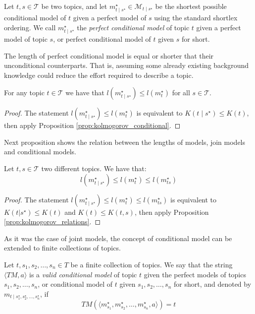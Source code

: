 \begin{definition}
Let $t,s \in \mathcal{T}$ be two topics, and let $m_{t \mid s^\star}^{\star} \in \mathcal{M}_{t \mid s^\star}$ be the shortest possible conditional model of $t$ given a perfect model of $s$ using the standard shortlex ordering. We call $m_{t \mid s^\star}^{\star}$ the \emph{perfect conditional model} of topic $t$ given a perfect model of topic $s$, or perfect conditional model of $t$ given $s$ for short.
\end{definition}

The length of perfect conditional model is equal or shorter that their unconditional counterparts. That is, assuming some already existing background knowledge could reduce the effort required to describe a topic.

\begin{proposition}
\label{prop:description_conditional_inequality}
For any topic $t \in \mathcal{T}$ we have that $l \left( m_{t \mid s^\star}^{\star} \right) \leq l \left(m^\star_t\right)$ for all $s \in \mathcal{T}$.
\end{proposition}
\begin{proof}
The statement $l \left( m_{t \mid s^\star}^{\star} \right) \leq l \left(m^\star_t\right)$ is equivalent to $K(t \mid s^\star) \leq K(t)$, then apply Proposition \ref{prop:kolmogorov_conditional}.
\end{proof}

Next proposition shows the relation between the lengths of models, join models and conditional models.

\begin{proposition}
\label{prop:description_conditional_joint}
Let $t, s \in \mathcal{T}$ two different topics. We have that:
\[
l \left( m_{t \mid s^\star}^{\star} \right) \leq l \left( m_t^\star \right) \leq l \left( m_{ts}^\star \right)
\]
\end{proposition}
\begin{proof}
The statement $l \left( m_{t \mid s^\star}^{\star} \right) \leq l \left( m_t^\star \right) \leq l \left( m_{ts}^\star \right)$ is equivalent to $K(t | s^\star ) \leq K(t)$ and $K(t) \leq K(t, s)$, then apply Proposition \ref{prop:kolmogorov_relations}.
\end{proof}

As it was the case of joint models, the concept of conditional model can be extended to finite collections of topics.

\begin{definition}
Let $t, s_1, s_2, \ldots, s_n \in T$ be a finite collection of topics. We say that the string $\langle TM,a \rangle$ is a \emph{valid conditional model} of topic $t$ given the perfect models of topics $s_1, s_2, \ldots, s_n$, or conditional model of $t$ given $s_1, s_2, \ldots, s_n$ for short, and denoted by $m_{t \mid s_1^\star, s_2^\star, \ldots, s_n^\star}$, if
\[
TM \left(\langle m_{s_1}^\star, m_{s_2}^\star, \ldots, m_{s_n}^\star, a \rangle \right) = t
\]
\end{definition}

